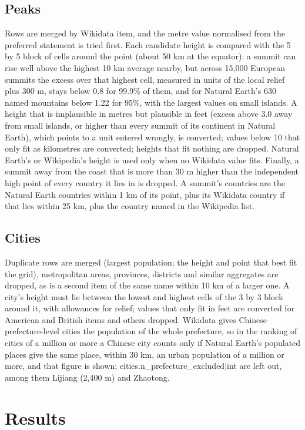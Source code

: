 \documentclass[11pt,a4paper]{article}
\begin{document}
\subsection{Peaks}
Rows are merged by Wikidata item, and the metre value normalised from the preferred statement is tried first. Each candidate height is compared with the 5 by 5 block of cells around the point (about 50 km at the equator): a summit can rise well above the highest 10 km average nearby, but across 15,000 European summits the excess over that highest cell, measured in units of the local relief plus 300 m, stays below 0.8 for 99.9\% of them, and for Natural Earth's 630 named mountains below 1.22 for 95\%, with the largest values on small islands. A height that is implausible in metres but plausible in feet (excess above 3.0 away from small islands, or higher than every summit of its continent in Natural Earth), which points to a unit entered wrongly, is converted; values below 10 that only fit as kilometres are converted; heights that fit nothing are dropped. Natural Earth's or Wikipedia's height is used only when no Wikidata value fits. Finally, a summit away from the coast that is more than 30 m higher than the independent high point of every country it lies in is dropped. A summit's countries are the Natural Earth countries within 1 km of its point, plus its Wikidata country if that lies within 25 km, plus the country named in the Wikipedia list.

\subsection{Cities}
Duplicate rows are merged (largest population; the height and point that best fit the grid), metropolitan areas, provinces, districts and similar aggregates are dropped, as is a second item of the same name within 10 km of a larger one. A city's height must lie between the lowest and highest cells of the 3 by 3 block around it, with allowances for relief; values that only fit in feet are converted for American and British items and others dropped. Wikidata gives Chinese prefecture-level cities the population of the whole prefecture, so in the ranking of cities of a million or more a Chinese city counts only if Natural Earth's populated places give the same place, within 30 km, an urban population of a million or more, and that figure is shown; {{cities.n_prefecture_excluded|int}} are left out, among them Lijiang (2,400 m) and Zhaotong.

\section{Results}
\end{document}
